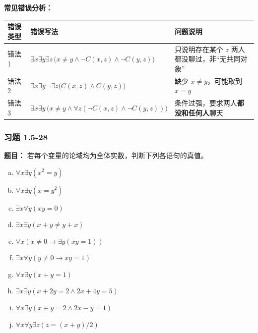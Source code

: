 \documentclass[11pt,UTF8]{article}
\begin{document}
\textbf{常见错误分析：}
\begin{center}
\begin{tabular}{l|l|l}
\hline
错误类型 & 错误写法 & 问题说明 \\
\hline
错法1 & $\exists x\exists y\exists z\,\bigl(x\neq y \land \neg C(x,z)\land \neg C(y,z)\bigr)$ & 只说明存在某个 $z$ 两人都没聊过，非``无共同对象'' \\
错法2 & $\exists x\exists y\,\neg\exists z\bigl(C(x,z)\land C(y,z)\bigr)$ & 缺少 $x\neq y$，可能取到 $x=y$ \\
错法3 & $\exists x\exists y\,\bigl(x\neq y \land \forall z(\neg C(x,z)\land \neg C(y,z))\bigr)$ & 条件过强，要求两人\textbf{都没和任何人}聊天 \\
\hline
\end{tabular}
\end{center}

\subsubsection*{习题 1.5-28}
\textbf{题目：} 若每个变量的论域均为全体实数，判断下列各语句的真值。
\begin{enumerate}[a)]
    \item $\forall x \exists y (x^2 = y)$
    \item $\forall x \exists y (x = y^2)$
    \item $\exists x \forall y (xy = 0)$
    \item $\exists x \exists y (x + y \neq y + x)$
    \item $\forall x (x \neq 0 \to \exists y (xy = 1))$
    \item $\exists x \forall y (y \neq 0 \to xy = 1)$
    \item $\forall x \exists y (x + y = 1)$
    \item $\exists x \exists y (x + 2y = 2 \land 2x + 4y = 5)$
    \item $\forall x \exists y (x + y = 2 \land 2x - y = 1)$
    \item $\forall x \forall y \exists z (z = (x + y)/2)$
\end{enumerate}
\end{document}
